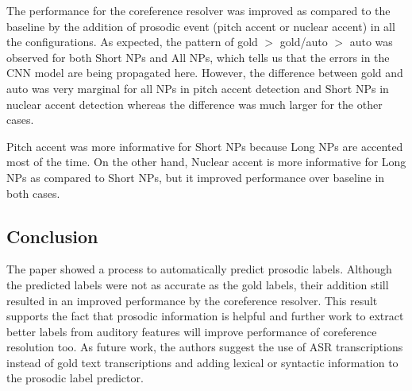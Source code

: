 \documentclass[a4paper]{article}
\begin{document}
The performance for the coreference resolver was improved as compared to the baseline by the addition of prosodic event (pitch accent or nuclear accent) in all the configurations. As expected, the pattern of gold $>$ gold/auto $>$ auto was observed for both Short NPs and All NPs, which tells us that the errors in the CNN model are being propagated here. However, the difference between gold and auto was very marginal for all NPs in pitch accent detection and Short NPs in nuclear accent detection whereas the difference was much larger for the other cases.

Pitch accent was more informative for Short NPs because Long NPs are accented most of the time. On the other hand, Nuclear accent is more informative for Long NPs as compared to Short NPs, but it improved performance over baseline in both cases.



\subsection{Conclusion}
The paper showed a process to automatically predict prosodic labels. Although the predicted labels were not as accurate as the gold labels, their addition still resulted in an improved performance by the coreference resolver. This result supports the fact that prosodic information is helpful and further work to extract better labels from auditory features will improve performance of coreference resolution too. As future work, the authors suggest the use of ASR transcriptions instead of gold text transcriptions and adding lexical or syntactic information to the prosodic label predictor.





\end{document}
